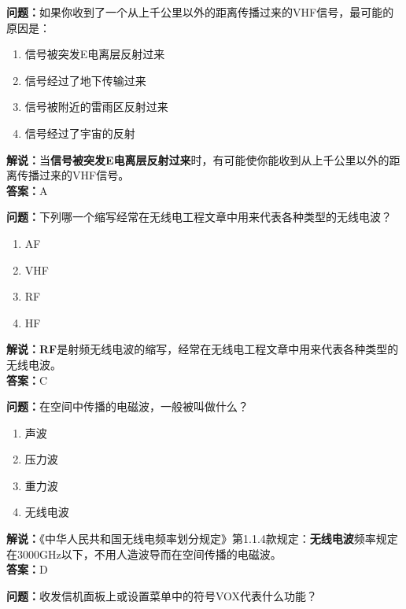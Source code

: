 \documentclass{ctexbook}
\begin{document}
\bigskip


\noindent\textbf{问题：}如果你收到了一个从上千公里以外的距离传播过来的VHF信号，最可能的原因是：

\begin{enumerate}[label=\Alph*), leftmargin=3em]
	\item 信号被突发E电离层反射过来
	\item 信号经过了地下传输过来
	\item 信号被附近的雷雨区反射过来
	\item 信号经过了宇宙的反射
\end{enumerate}

\noindent\textbf{解说：}当\textbf{信号被突发E电离层反射过来}时，有可能使你能收到从上千公里以外的距离传播过来的VHF信号。\\\noindent\textbf{答案：}A


\bigskip


\noindent\textbf{问题：}下列哪一个缩写经常在无线电工程文章中用来代表各种类型的无线电波？

\begin{enumerate}[label=\Alph*), leftmargin=3em]
	\item AF
	\item VHF
	\item RF
	\item HF
\end{enumerate}

\noindent\textbf{解说：RF}是射频无线电波的缩写，经常在无线电工程文章中用来代表各种类型的无线电波。\\\noindent\textbf{答案：}C


\bigskip


\noindent\textbf{问题：}在空间中传播的电磁波，一般被叫做什么？

\begin{enumerate}[label=\Alph*), leftmargin=3em]
	\item 声波
	\item 压力波
	\item 重力波
	\item 无线电波
\end{enumerate}

\noindent\textbf{解说：}《中华人民共和国无线电频率划分规定》第1.1.4款规定：\textbf{无线电波}频率规定在3000GHz以下，不用人造波导而在空间传播的电磁波。\\\noindent\textbf{答案：}D


\bigskip


\noindent\textbf{问题：}收发信机面板上或设置菜单中的符号VOX代表什么功能？
\end{document}
